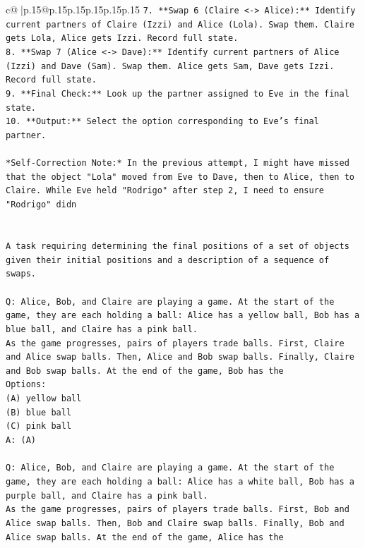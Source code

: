 \documentclass{article}
\begin{document}
{\begin{supertabular}{c@{$\;$}|p{.15\linewidth}@{}p{.15\linewidth}p{.15\linewidth}p{.15\linewidth}p{.15\linewidth}p{.15\linewidth}}
{{{\texttt{7.  **Swap 6 (Claire <{-}> Alice):** Identify current partners of Claire (Izzi) and Alice (Lola). Swap them. Claire gets Lola, Alice gets Izzi. Record full state.} \\
\texttt{8.  **Swap 7 (Alice <{-}> Dave):** Identify current partners of Alice (Izzi) and Dave (Sam). Swap them. Alice gets Sam, Dave gets Izzi. Record full state.} \\
\texttt{9.  **Final Check:** Look up the partner assigned to Eve in the final state.} \\
\texttt{10. **Output:** Select the option corresponding to Eve's final partner.} \\
\\ 
\texttt{*Self{-}Correction Note:* In the previous attempt, I might have missed that the object "Lola" moved from Eve to Dave, then to Alice, then to Claire. While Eve held "Rodrigo" after step 2, I need to ensure "Rodrigo" didn} \\
\\ 
\\ 
\texttt{A task requiring determining the final positions of a set of objects given their initial positions and a description of a sequence of swaps.} \\
\\ 
\texttt{Q: Alice, Bob, and Claire are playing a game. At the start of the game, they are each holding a ball: Alice has a yellow ball, Bob has a blue ball, and Claire has a pink ball.} \\
\texttt{As the game progresses, pairs of players trade balls. First, Claire and Alice swap balls. Then, Alice and Bob swap balls. Finally, Claire and Bob swap balls. At the end of the game, Bob has the} \\
\texttt{Options:} \\
\texttt{(A) yellow ball} \\
\texttt{(B) blue ball} \\
\texttt{(C) pink ball} \\
\texttt{A: (A)} \\
\\ 
\texttt{Q: Alice, Bob, and Claire are playing a game. At the start of the game, they are each holding a ball: Alice has a white ball, Bob has a purple ball, and Claire has a pink ball.} \\
\texttt{As the game progresses, pairs of players trade balls. First, Bob and Alice swap balls. Then, Bob and Claire swap balls. Finally, Bob and Alice swap balls. At the end of the game, Alice has the} \\
}}}
\end{supertabular}}
\end{document}
